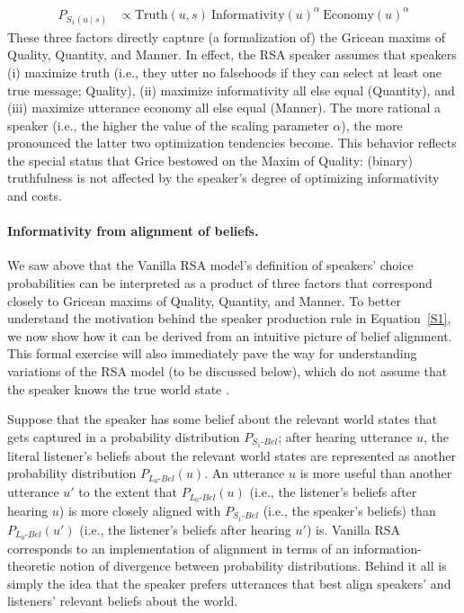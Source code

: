 \documentclass[10pt,letterpaper]{article}
\newcommand{\sem}[1]{\ensuremath{[\![#1]\!]}}
\begin{document}
\begin{align} \label{eq:S1-three-factor-formulation}
  P_{S_1(u\mid s)}   & \propto \text{Truth}(u,s) \ \text{Informativity}(u)^{\alpha} \ \text{Economy}(u)^{\alpha} %
\end{align}
These three factors directly capture (a formalization of) the Gricean maxims of Quality,
Quantity, and Manner. In effect, the RSA speaker assumes that speakers (i) maximize truth
(i.e., they utter no falsehoods if they can select at least one
true message; Quality), (ii) maximize informativity all else equal (Quantity), and (iii) maximize utterance
economy all else equal (Manner). The more rational a speaker (i.e., the higher the value of the scaling parameter $\alpha$), the more
pronounced the latter two optimization tendencies become. This behavior reflects the special
status that Grice bestowed on the Maxim of Quality: (binary) truthfulness is not affected by
the speaker's degree of optimizing informativity and costs.

\paragraph{Informativity from alignment of beliefs.} We saw above that the Vanilla RSA
model's definition of speakers' choice probabilities can be interpreted as a product of three
factors that correspond closely to Gricean maxims of Quality, Quantity, and Manner.
To better understand the motivation behind the speaker production rule in Equation~\eqref{S1}, we now show how it can be derived from an intuitive picture of belief alignment.
This formal exercise will also immediately pave the way for understanding variations of the RSA model (to be discussed below), which do not assume that the speaker knows the true world state \cite{goodmanstuhlmuller2013,scontrasgoodman2017,HerbstrittFranke2019:Complex-probabi}.

Suppose that the speaker has some belief about the relevant world states that gets captured in a probability distribution $P_{S_{1}\text{-}Bel}$;
after hearing utterance $u$, the literal listener's beliefs about the relevant world states are represented as another probability distribution $P_{L_{0}\text{-}Bel}(u)$.
An utterance $u$ is more useful than another utterance $u'$ to the extent that $P_{L_{0}\text{-}Bel}(u)$  (i.e., the listener's beliefs after hearing $u$) is more closely aligned with $P_{S_{1}\text{-}Bel}$ (i.e., the speaker's beliefs) than $P_{L_{0}\text{-}Bel}(u')$ (i.e., the listener's beliefs after hearing $u'$) is.
Vanilla RSA corresponds to an implementation of alignment in terms of an information-theoretic notion of divergence between probability distributions.
Behind it all is simply the idea that the speaker prefers utterances that best align speakers' and listeners' relevant beliefs about the world.
\end{document}
